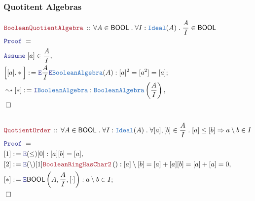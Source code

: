 \documentclass[12pt]{scrartcl}
\newcommand{\TYPE}[1]{\textcolor{NavyBlue}{\mathtt{#1}}}
\newcommand{\LOGIC}[1]{\textcolor{Blue}{\mathtt{#1}}}
\newcommand{\THM}[1]{\textcolor{Maroon}{\mathtt{#1}}}
\renewcommand{\.}{\; . \;}
\newcommand{\de}{: \kern 0.1pc =}
\newcommand{\Theorem}[2]{& \THM{#1} \, :: \, #2 \\ & \Proof = \\ }
\newcommand{\Page}[1]{ \begin{align*} #1 \end{align*}   }
\newcommand{\Imply}{\Rightarrow}
\newcommand{\Intro}{\LOGIC{I}}
\newcommand{\Elim}{\LOGIC{E}}
\newcommand{\Say}[3]{& #1 \de #2 : #3, \\}
\newcommand{\Conclude}[3]{& #1 \de #2 : #3; \\}
\newcommand{\Derive}[3]{& \leadsto #1 \de #2 : #3, \\}
\newcommand{\AssumeIn}[2]{& \LOGIC{Assume} \; #1 \in #2, \\}
\newcommand{\QED}{\; \square}
\newcommand{\EndProof}{& \QED \\}
\newcommand{\Proof}{\LOGIC{Proof} \; }
\newcommand{\Ideal}{\TYPE{Ideal}}
\newcommand{\BA}{\TYPE{BooleanAlgebra}}
\newcommand{\BOOL}{\mathsf{BOOL}}
\begin{document}
\subsubsection{Quotitent Algebras} 
\Page{
	\Theorem{BooleanQuotientAlgebra}
	{
		\forall A \in \BOOL  \.
		\forall I : \Ideal(A) \.
		\frac{A}{I} \in \BOOL
	}
	\AssumeIn{[a]}{\frac{A}{I}}
	\Conclude{\Big[[a].*\Big]}{\Elim \frac{A}{I} \Elim \BA(A)}
	{
		[a]^2 = [a^2] = [a]
	}
	\Derive{[*]}{\Intro \BA}{\BA\left( \frac{A}{I} \right)}
	\EndProof
	\\
	\Theorem{QuotientOrder}
	{
		\forall A \in \BOOL \.
		\forall I : \Ideal(A) \.
		\forall [a],[b] \in \frac{A}{I} \. 
		[a] \le [b]
		\Imply
		a \setminus b \in I
	}
	\Say{[1]}{\Elim (\le)[0]}
	{
		[a][b] = [a]
	}
	\Say{[2]}{\Elim(\setminus)[1]\THM{BooleanRingHasChar2}\left( \right)}
	{
		[a]\setminus [b] = 
		[a] + [a][b] =
		[a] + [a] = 0
	}
	\Conclude{[*]}{\Elim \BOOL\left(A,\frac{A}{I},[\cdot]\right)}
	{
		a \setminus b \in I
	}
	\EndProof
}
\newpage
\end{document}
